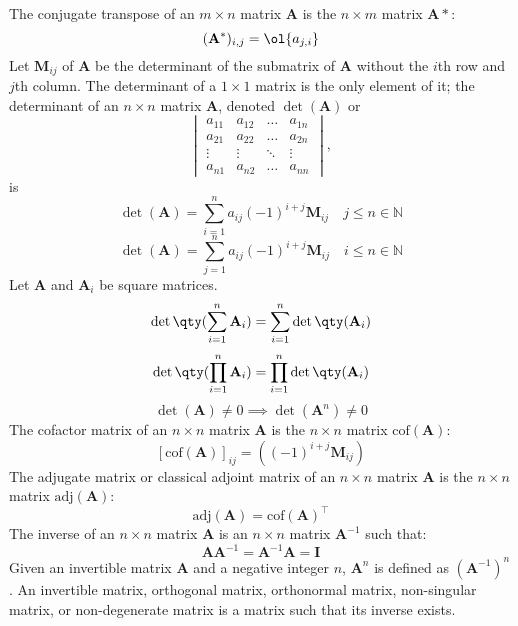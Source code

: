 \documentclass[a4paper,12pt]{report}
\begin{document}
The conjugate transpose of an $m\times n$ matrix $\mathbf{A}$ is the $n\times m$ matrix $\mathbf{A}*$:
\[(\mathbf{A}^*)_{i,j}=\ol{a_{j,i}}\]
Let $\mathbf{M}_{ij}$ of $\mathbf{A}$ be the determinant of the submatrix of $\mathbf{A}$ without the $i$th row and $j$th column.
The determinant of a $1\times 1$ matrix is the only element of it; the determinant of an $n\times n$ matrix $\mathbf{A}$, denoted $\det(\mathbf{A})$ or 
\[\begin{vmatrix}a_{11} & a_{12} & \ldots & a_{1n}\\a_{21} & a_{22} & \ldots & a_{2n}\\\vdots & \vdots & \ddots & \vdots\\a_{n1} & a_{n2} & \ldots & a_{nn}\end{vmatrix},\]
is
\[\det(\mathbf{A})=\sum_{i=1}^na_{ij}(-1)^{i+j}\mathbf{M}_{ij}\quad j\leq n\in\mathbb{N}\]
\[\det(\mathbf{A})=\sum_{j=1}^na_{ij}(-1)^{i+j}\mathbf{M}_{ij}\quad i\leq n\in\mathbb{N}\]
Let $\mathbf{A}$ and $\mathbf{A}_i$ be square matrices.
\[\det\qty(\sum_{i=1}^n\mathbf{A}_i)=\sum_{i=1}^n\det\qty(\mathbf{A}_i)\]
\[\det\qty(\prod_{i=1}^n\mathbf{A}_i)=\prod_{i=1}^n\det\qty(\mathbf{A}_i)\]
\[\det(\mathbf{A})\neq 0\implies\det(\mathbf{A}^n)\neq 0\]
The cofactor matrix of an $n\times n$ matrix $\mathbf{A}$ is the $n\times n$ matrix $\mathrm{cof}(\mathbf{A})$:
\[[\mathrm{cof}(\mathbf{A})]_{ij}=\left((-1)^{i+j}\mathbf{M}_{ij}\right)\]
The adjugate matrix or classical adjoint matrix of an $n\times n$ matrix $\mathbf{A}$ is the $n\times n$ matrix $\mathrm{adj}(\mathbf{A})$:
\[\mathrm{adj}(\mathbf{A})=\mathrm{cof}(\mathbf{A})^\top\]
The inverse of an $n\times n$ matrix $\mathbf{A}$ is an $n\times n$ matrix $\mathbf{A}^{-1}$ such that:
\[\mathbf{A}\mathbf{A}^{-1}=\mathbf{A}^{-1}\mathbf{A}=\mathbf{I}\]
Given an invertible matrix $\mathbf{A}$ and a negative integer $n$, $\mathbf{A}^n$ is defined as $(\mathbf{A}^{-1})^n$.
An invertible matrix, orthogonal matrix, orthonormal matrix, non-singular matrix, or non-degenerate matrix is a matrix such that its inverse exists.
\end{document}
